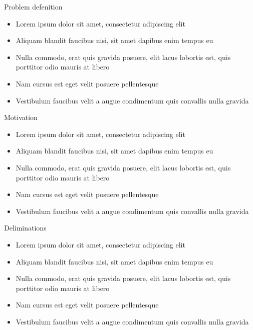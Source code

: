 \begin{frame}{Problem defenition}
    \begin{itemize}
        \item Lorem ipsum dolor sit amet, consectetur adipiscing elit
        \item Aliquam blandit faucibus nisi, sit amet dapibus enim tempus eu
        \item Nulla commodo, erat quis gravida posuere, elit lacus lobortis est, quis porttitor odio mauris at libero
        \item Nam cursus est eget velit posuere pellentesque
        \item Vestibulum faucibus velit a augue condimentum quis convallis nulla gravida
    \end{itemize}
\end{frame}


\begin{frame}{Motivation}
    \begin{itemize}
        \item Lorem ipsum dolor sit amet, consectetur adipiscing elit
        \item Aliquam blandit faucibus nisi, sit amet dapibus enim tempus eu
        \item Nulla commodo, erat quis gravida posuere, elit lacus lobortis est, quis porttitor odio mauris at libero
        \item Nam cursus est eget velit posuere pellentesque
        \item Vestibulum faucibus velit a augue condimentum quis convallis nulla gravida
    \end{itemize}
\end{frame}


\begin{frame}{Deliminations}
    \begin{itemize}
        \item Lorem ipsum dolor sit amet, consectetur adipiscing elit
        \item Aliquam blandit faucibus nisi, sit amet dapibus enim tempus eu
        \item Nulla commodo, erat quis gravida posuere, elit lacus lobortis est, quis porttitor odio mauris at libero
        \item Nam cursus est eget velit posuere pellentesque
        \item Vestibulum faucibus velit a augue condimentum quis convallis nulla gravida
    \end{itemize}
\end{frame}


